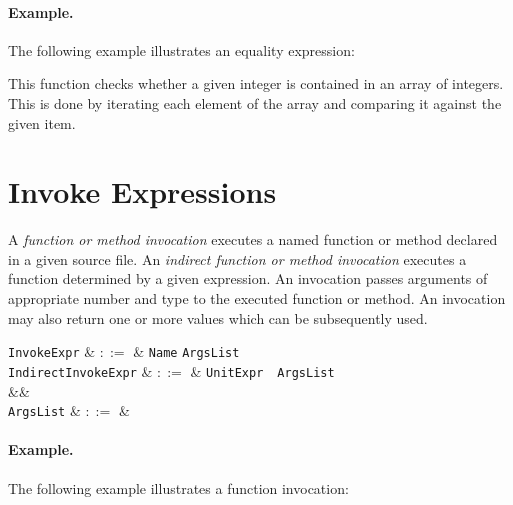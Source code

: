 \paragraph{Example.}

The following example illustrates an equality expression:



This function checks whether a given integer is contained in an array of integers.  This is done by iterating each element of the array and comparing it against the given item.


\section{Invoke Expressions}
\label{c_expr_invoke}
A {\em function or method invocation} executes a named function or method declared in a given source file.  An {\em indirect function or method invocation} executes a function determined by a given expression.  An invocation passes arguments of appropriate number and type to the executed function or method.  An invocation may also return one or more values which can be subsequently used.


\begin{syntax}
  \verb+InvokeExpr+ & $::=$ & \verb+Name+ \token{(} \verb+ArgsList+ \token{)}\\
  \verb+IndirectInvokeExpr+ & $::=$ & \verb+UnitExpr+\ \token{(}\ \verb+ArgsList+\ \token{)}\\
&&\\
\verb+ArgsList+ & $::=$ & \\
\end{syntax}

\paragraph{Example.}

The following example illustrates a function invocation:



